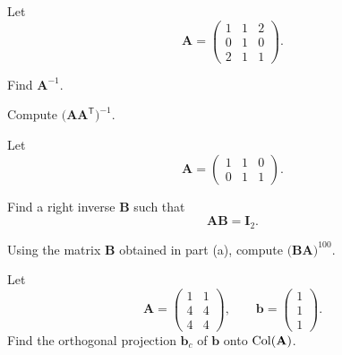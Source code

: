 \begin{problem}
Let
\[
\mathbf A=
\begin{pmatrix}
1&1&2\\
0&1&0\\
2&1&1
\end{pmatrix}.
\]
\begin{problemsubparts}
\item Find $\mathbf A^{-1}$.
\item Compute $\bigl(\mathbf A\mathbf A^{\mathsf T}\bigr)^{-1}$.
\end{problemsubparts}
\end{problem}

\begin{problem}
Let
\[
\mathbf A=
\begin{pmatrix}
1&1&0\\
0&1&1
\end{pmatrix}.
\]
\begin{problemsubparts}
\item Find a right inverse $\mathbf B$ such that
\[
\mathbf A\mathbf B=\mathbf I_2.
\]
\item Using the matrix $\mathbf B$ obtained in part \textup{(a)}, compute $\bigl(\mathbf B\mathbf A\bigr)^{100}$.
\end{problemsubparts}
\end{problem}

\begin{problem}
Let
\[
\mathbf A=
\begin{pmatrix}
1&1\\
4&4\\
4&4
\end{pmatrix},
\qquad
\mathbf b=
\begin{pmatrix}
1\\1\\1
\end{pmatrix}.
\]
Find the orthogonal projection $\mathbf b_c$ of $\mathbf b$ onto $\operatorname{Col}(\mathbf A)$.
\end{problem}

